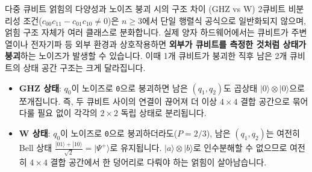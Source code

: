 \documentclass[11pt, a4paper]{article}
\newcommand{\ket}[1]{|#1\rangle}
\theoremstyle{definition}
\begin{document}
\begin{notebox}{다중 큐비트 얽힘의 다양성과 노이즈 붕괴 시의 구조 차이 (GHZ vs W)}
2큐비트 비분리성 조건($c_{00}c_{11}-c_{01}c_{10} \neq 0$)은 $n \ge 3$에서 단일 행렬식 공식으로 일반화되지 않으며, 얽힘 구조 자체가 여러 클래스로 분화합니다. 실제 양자 하드웨어에서는 큐비트가 주변 열이나 전자기파 등 외부 환경과 상호작용하면 \textbf{외부가 큐비트를 측정한 것처럼 상태가 붕괴}하는 노이즈가 발생할 수 있습니다. 이때 1개 큐비트가 붕괴한 직후 남은 2개 큐비트의 상태 공간 구조는 크게 달라집니다.
\begin{itemize}
    \item \textbf{GHZ 상태}: $q_0$이 노이즈로 \texttt{0}으로 붕괴하면 남은 $(q_1, q_2)$도 곱상태 $\ket{0}\otimes\ket{0}$으로 쪼개집니다. 즉, 두 큐비트 사이의 연결이 끊어져 더 이상 $4\times 4$ 결합 공간으로 묶어 다룰 필요 없이 각각의 $2\times 2$ 독립 상태로 분리됩니다.
    \item \textbf{W 상태}: $q_0$이 노이즈로 \texttt{0}으로 붕괴하더라도($P=2/3$), 남은 $(q_1, q_2)$는 여전히 Bell 상태 $\frac{\ket{01}+\ket{10}}{\sqrt{2}} = \ket{\Psi^+}$로 유지됩니다. $\ket{a}\otimes\ket{b}$로 인수분해할 수 없으므로 여전히 $4\times 4$ 결합 공간에서 한 덩어리로 다뤄야 하는 얽힘이 살아남습니다.
\end{itemize}
\end{notebox}
\end{document}
